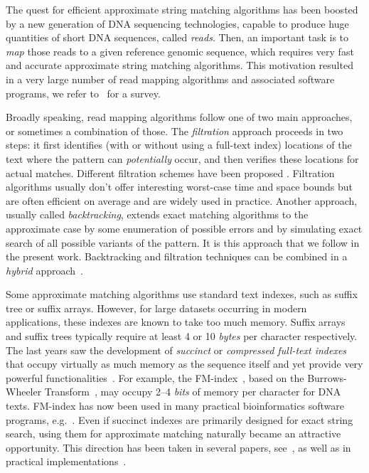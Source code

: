 \documentclass[12pt]{article}
\begin{document}
The quest for efficient approximate string matching algorithms has
been boosted by a new generation of DNA sequencing
technologies, capable to produce huge quantities of short 
DNA sequences, called \emph{reads}. 
Then, an important task is to \emph{map} 
those reads to a given reference genomic sequence,
which requires very fast and accurate approximate string matching
algorithms. 
This motivation resulted in a very large number of read mapping algorithms and
associated software programs, 
we refer to~\cite{Li01092010} for a survey.

Broadly speaking, 
read mapping algorithms follow one of two main approaches, or sometimes
a combination of those. 
The \emph{filtration} approach proceeds in two
steps: it first identifies (with or without using a full-text index)
locations of the text where the pattern can \emph{potentially} occur,
and then verifies these locations for actual matches. Different filtration schemes have been proposed
\cite{NavarroRaffinot-book02,FarachLST-conf,KucherovNoeRoytbergJCBB05,KarkkainenN07}. Filtration
algorithms usually don't offer interesting worst-case time and space bounds but are
often efficient on average and are widely used in practice. 
Another approach, usually called \emph{backtracking}, 
extends exact matching algorithms to the approximate case by some
enumeration of possible errors and by simulating exact search of all
possible variants of the pattern. It is this approach that we follow in
the present work. Backtracking and filtration techniques can be
combined in a \emph{hybrid} approach~\cite{NavarroB00}. 

Some approximate matching algorithms use standard text indexes, such as
suffix tree or suffix arrays. However, for large
datasets occurring in modern applications, these indexes are
known to take too much memory. Suffix arrays and suffix trees
typically require at least 4 or 10 \emph{bytes} per character respectively. 
The last years saw the development of \emph{succinct} or \emph{compressed full-text indexes}
that occupy virtually as much memory as the sequence itself and yet
provide very powerful functionalities~\cite{NavarroM07}.
For example, the FM-index~\cite{FerraginaM00},
based on the Burrows-Wheeler Transform~\cite{BurrowW94}, may
occupy 2--4 \emph{bits} of memory {per character} for DNA texts. FM-index has now been used in
many practical bioinformatics software programs,
e.g.~\cite{LangmeadTPS09,LiD09,Simpson01032012}.
Even if succinct indexes are primarily
designed for exact string search, using them for approximate matching
naturally became an attractive opportunity. This direction has been
taken in several papers, see~\cite{RussoEtAlAlgorithms09}, as well as
in practical implementations~\cite{Simpson01032012}. 
\end{document}
